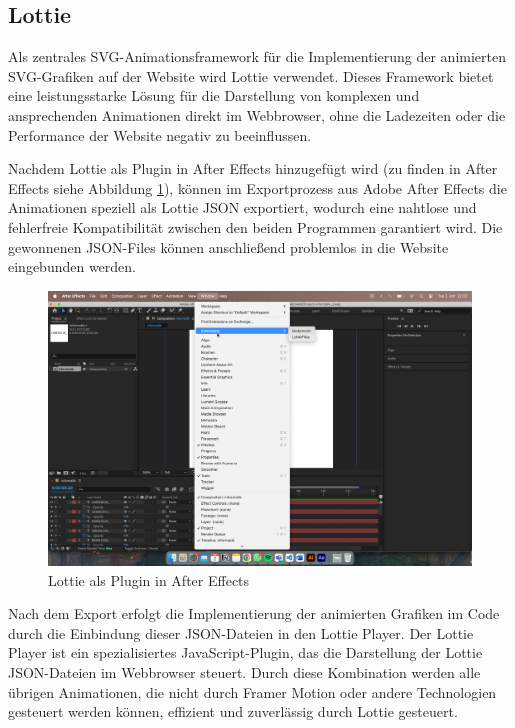  \subsection{Lottie}
Als zentrales SVG-Animationsframework für die Implementierung der animierten SVG-Grafiken auf der Website wird Lottie verwendet. 
Dieses Framework bietet eine leistungsstarke Lösung für die Darstellung von komplexen und ansprechenden Animationen direkt im Webbrowser, 
ohne die Ladezeiten oder die Performance der Website negativ zu beeinflussen.

Nachdem Lottie als Plugin in After Effects hinzugefügt wird (zu finden in After Effects siehe Abbildung \ref{fig:impl:plugin:lottie}), können im Exportprozess aus Adobe After Effects die Animationen speziell als Lottie JSON 
exportiert, wodurch eine nahtlose und fehlerfreie Kompatibilität zwischen den beiden Programmen garantiert wird. Die gewonnenen JSON-Files 
können anschließend problemlos in die 
Website eingebunden werden.

\begin{figure}
   \begin{minipage}[b]{.4\linewidth} 
      \includegraphics[width=\linewidth]{pics/plugin lottie.png}
      \caption{Lottie als Plugin in After Effects}
      \label{fig:impl:plugin:lottie}
   \end{minipage}
\end{figure}

Nach dem Export erfolgt die Implementierung der animierten Grafiken im Code durch die Einbindung dieser JSON-Dateien 
in den Lottie Player. Der Lottie Player ist ein spezialisiertes JavaScript-Plugin, das die Darstellung der Lottie JSON-Dateien im 
Webbrowser steuert. Durch diese Kombination werden alle übrigen Animationen, die nicht durch Framer Motion oder andere Technologien 
gesteuert werden können, effizient und zuverlässig durch Lottie gesteuert.

